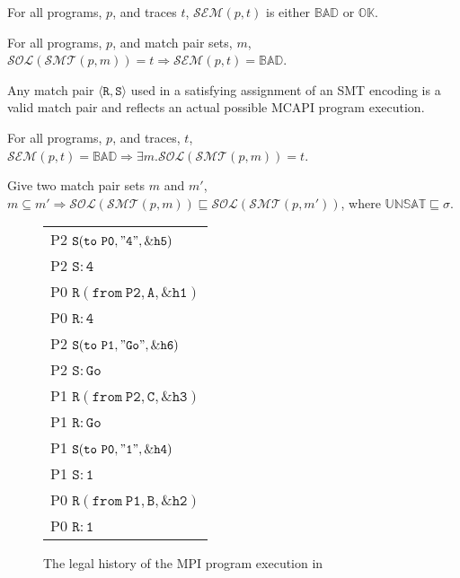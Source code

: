\begin{definition}[Semantics]
For all programs, $p$, and traces $t$, $\mathcal{SEM}(p, t)$ is either
$\mathbb{BAD}$ or $\mathbb{OK}$.
\end{definition}

\begin{theorem}[Soundness]
For all programs, $p$, and match pair sets, $m$,
$\mathcal{SOL}(\mathcal{SMT}(p, m)) = t \Rightarrow \mathcal{SEM}(p, t) =
\mathbb{BAD}$.
\end{theorem}


\begin{lemma} \label{lem:bogus}
Any match pair $\langle \mathtt{R}, \mathtt{S}\rangle$ used in a
satisfying assignment of an SMT encoding is a valid match pair and
reflects an actual possible MCAPI program execution.
\end{lemma}

\begin{theorem}[Completeness]
For all programs, $p$, and traces, $t$, $\mathcal{SEM}(p, t) =
\mathbb{BAD} \Rightarrow \exists m . \mathcal{SOL}(\mathcal{SMT}(p,
m)) = t$.
\end{theorem}

\begin{theorem}[Approximation]
Give two match pair sets $m$ and $m'$, $m \subseteq m' \Rightarrow \mathcal{SOL}(\mathcal{SMT}(p, m))
  \sqsubseteq \mathcal{SOL}(\mathcal{SMT}(p, m'))$, where
  $\mathbb{UNSAT} \sqsubseteq \sigma$.
\end{theorem}

\begin{figure}[h1]
\begin{center}
\setlength{\tabcolsep}{2pt}
\small \begin{tabular}[t]{l}
P2 $\mathtt{S(to\ P0, "4", \&h5)}$ \\
P2 $\mathtt{S: 4}$\\
P0 $\mathtt{R(from\ P2, A, \&h1)}$ \\
P0 $\mathtt{R: 4}$ \\
P2 $\mathtt{S(to\ P1, "Go", \&h6)}$ \\
P2 $\mathtt{S: Go}$ \\
P1 $\mathtt{R(from\ P2, C, \&h3)}$ \\
P1 $\mathtt{R: Go}$ \\
P1 $\mathtt{S(to\ P0, "1", \&h4)}$ \\
P1 $\mathtt{S: 1}$ \\
P0 $\mathtt{R(from\ P1, B, \&h2)}$ \\
P0 $\mathtt{R: 1}$ \\
\end{tabular}
\end{center}
\caption{The legal history of the MPI program execution in }
\label{fig:history}
\end{figure}

